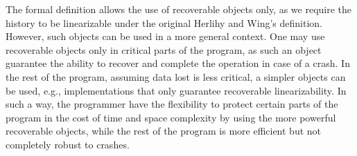 The formal definition allows the use of recoverable objects only, as we require the history to be linearizable under the original Herlihy and Wing's definition. However, such objects can be used in a more general context. One may use recoverable objects only in critical parts of the program, as such an object guarantee the ability to recover and complete the operation in case of a crash. In the rest of the program, assuming data lost is less critical, a simpler objects can be used, e.g., implementations that only guarantee recoverable linearizability.
In such a way, the programmer have the flexibility to protect certain parts of the program in the cost of time and space complexity by using the more powerful recoverable objects, while the rest of the program is more efficient but not completely robust to crashes.
